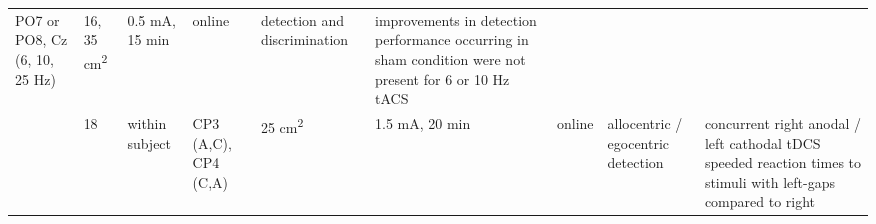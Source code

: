 \documentclass[11pt,english,]{memoir}
\begin{document}
\begin{longtable}[]{@{}lllllllll@{}}
\begin{minipage}[t]{0.11\columnwidth}
PO7 or PO8, Cz (6, 10, 25
Hz)\strut
\end{minipage} & \begin{minipage}[t]{0.03\columnwidth}\raggedright
16,
35
cm\textsuperscript{2}\strut
\end{minipage} & \begin{minipage}[t]{0.05\columnwidth}\raggedright
0.5 mA, 15
min\strut
\end{minipage} & \begin{minipage}[t]{0.05\columnwidth}\raggedright
online\strut
\end{minipage} & \begin{minipage}[t]{0.11\columnwidth}\raggedright
detection and
discrimination\strut
\end{minipage} & \begin{minipage}[t]{0.24\columnwidth}\raggedright
improvements in detection performance occurring in sham
condition were not present for 6 or 10 Hz tACS\strut
\end{minipage}\tabularnewline
\begin{minipage}[t]{0.12\columnwidth}\raggedright
\textcite{Medina2013}\strut
\end{minipage} & \begin{minipage}[t]{0.02\columnwidth}\raggedright
18\strut
\end{minipage} & \begin{minipage}[t]{0.04\columnwidth}\raggedright
within
subject\strut
\end{minipage} & \begin{minipage}[t]{0.11\columnwidth}\raggedright
CP3 (A,C), CP4 (C,A)\strut
\end{minipage} & \begin{minipage}[t]{0.03\columnwidth}\raggedright
25
cm\textsuperscript{2}\strut
\end{minipage} & \begin{minipage}[t]{0.05\columnwidth}\raggedright
1.5 mA, 20
min\strut
\end{minipage} & \begin{minipage}[t]{0.05\columnwidth}\raggedright
online\strut
\end{minipage} & \begin{minipage}[t]{0.11\columnwidth}\raggedright
allocentric / egocentric
detection\strut
\end{minipage} & \begin{minipage}[t]{0.24\columnwidth}\raggedright
concurrent right anodal / left cathodal tDCS speeded
reaction times to stimuli with left-gaps compared to right

\end{minipage}
\end{longtable}
\end{document}
